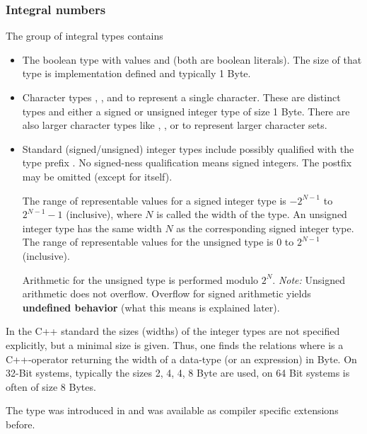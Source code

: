 \subsubsection{Integral numbers}
The group of integral types contains
\begin{itemize}
  \item The boolean type  with values  and  (both are boolean literals). The size of that type is implementation defined and typically 1 Byte.

  \item Character types , , and  to represent a single character. These are distinct types and either a signed or unsigned integer type of size 1 Byte. There are also larger character types like , , or  to represent larger character sets.

  \item Standard (signed/unsigned) integer types include  possibly qualified with the type prefix . No signed-ness qualification means signed integers. The postfix  may be omitted (except for  itself).

  The range of representable values for a signed integer type is $-2^{N-1}$ to $2^{N-1} - 1$ (inclusive), where $N$ is called the width of the type. An unsigned integer type has the same width $N$ as the corresponding signed integer type. The range of representable values for the unsigned type is $0$ to $2^{N-1}$ (inclusive).

  Arithmetic for the unsigned type is performed modulo $2^N$. \emph{Note:} Unsigned arithmetic does not overflow. Overflow for signed arithmetic yields \textbf{undefined behavior} (what this means is explained later).
\end{itemize}

In the C++ standard the sizes (widths) of the integer types are not specified explicitly, but a minimal size is given. Thus, one finds the relations
%
%
where  is a C++-operator returning the width of a data-type (or an expression) in Byte. On 32-Bit systems, typically the sizes 2, 4, 4, 8 Byte are used, on 64 Bit systems  is often of size 8 Bytes.

The\marginpar{[\cxx{11}]} type  was introduced in  and was available as compiler specific extensions before.

